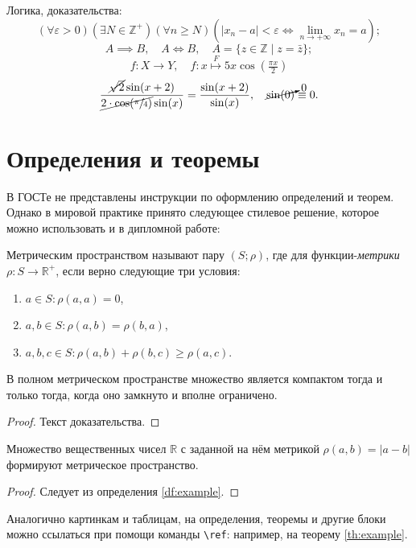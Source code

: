 Логика, доказательства:
\begin{equation}
    (\forall \varepsilon > 0) (\exists N \in \mathbb Z^+) (\forall n \ge N) (|x_n - a| < \varepsilon \iff \lim_{n \to +\infty} x_n = a);
\end{equation}
\begin{equation}
    A \implies B, \quad A \iff B, \quad A = \{z \in \mathbb Z \mid z = \bar z \};
\end{equation}
\begin{equation}
    f: X \to Y, \quad f: x \overset{F}{\mapsto} 5x \cos(\tfrac{\pi x}{2})
\end{equation}
\begin{equation}
    \frac{\cancel{\sqrt 2} \sin(x + 2)}{\cancel{2 \cdot \cos(\sfrac{\pi}{4})} \sin(x)} = \frac{\sin(x + 2)}{\sin(x)}, \quad \cancelto{0}{\sin(0)} \equiv 0.
\end{equation}

\section{Определения и теоремы}

В ГОСТе не представлены инструкции по оформлению определений и теорем. Однако в мировой практике принято следующее стилевое решение, которое можно использовать и в дипломной работе:

\begin{Df}\label{df:example}
    Метрическим пространством называют пару $(S; \rho)$, где для функции-\textit{метрики} $\rho: S \to \mathbb R^+$, если верно следующие три условия:
    \begin{enumerate}
        \item $a \in S : \rho(a, a) = 0$,
        \item $a, b \in S : \rho(a, b) = \rho(b, a)$,
        \item $a, b, c \in S : \rho(a, b) + \rho(b, c) \ge \rho(a, c)$.
    \end{enumerate}
\end{Df}

\begin{Th}[Хаусдорф]\label{th:example}
    В полном метрическом пространстве множество является компактом тогда и только тогда, когда оно замкнуто и вполне ограничено.
\end{Th}
\begin{proof}
    Текст доказательства.
\end{proof}

\begin{Ex}
    Множество вещественных чисел $\mathbb R$ с заданной на нём метрикой $\rho(a, b) = |a - b|$ формируют метрическое пространство.
\end{Ex}
\begin{proof}
    Следует из определения \ref{df:example}.
\end{proof}

Аналогично картинкам и таблицам, на определения, теоремы и другие блоки можно ссылаться при помощи команды \verb|\ref|: например, на теорему \ref{th:example}.
